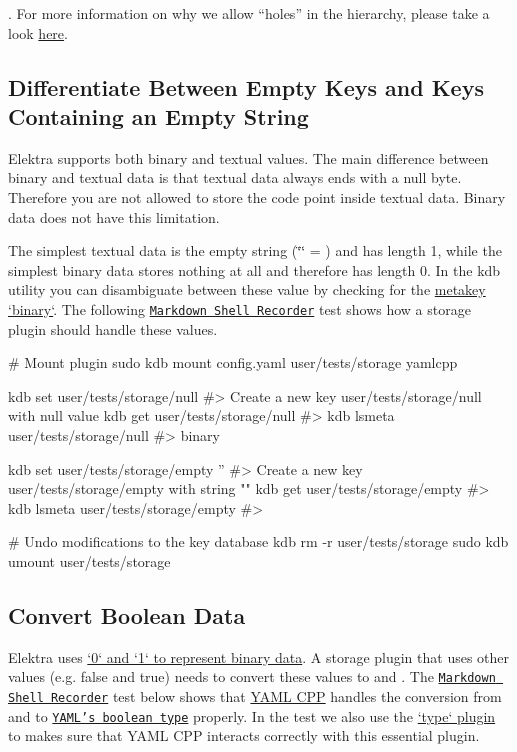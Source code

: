 . For more information on why we allow “holes” in the hierarchy, please take a look \hyperlink{doc_decisions_holes_md}{here}.

\subsection*{Differentiate Between Empty Keys and Keys Containing an Empty String}

Elektra supports both binary and textual values. The main difference between binary and textual data is that textual data always ends with a null byte. Therefore you are not allowed to store the code point {} inside textual data. Binary data does not have this limitation.

The simplest textual data is the empty string ({\ttfamily \char`\"{}\char`\"{}} = {}) and has length 1, while the simplest binary data stores nothing at all and therefore has length 0. In the {\ttfamily kdb} utility you can disambiguate between these value by checking for the \hyperlink{doc_help_elektra-metadata_md}{metakey `binary`}. The following \href{https://master.libelektra.org/tests/shell/shell_recorder/tutorial_wrapper}{\tt Markdown Shell Recorder} test shows how a storage plugin should handle these values.


\begin{DoxyCode}
# Mount plugin
sudo kdb mount config.yaml user/tests/storage yamlcpp

kdb set user/tests/storage/null
#> Create a new key user/tests/storage/null with null value
kdb get user/tests/storage/null
#>
kdb lsmeta user/tests/storage/null
#> binary

kdb set user/tests/storage/empty ''
#> Create a new key user/tests/storage/empty with string ""
kdb get user/tests/storage/empty
#>
kdb lsmeta user/tests/storage/empty
#>

# Undo modifications to the key database
kdb rm -r user/tests/storage
sudo kdb umount user/tests/storage
\end{DoxyCode}


\subsection*{Convert Boolean Data}

Elektra uses \hyperlink{doc_decisions_bool_md}{`0` and `1` to represent binary data}. A storage plugin that uses other values (e.\+g. {\ttfamily false} and {\ttfamily true}) needs to convert these values to {} and {}. The \href{https://master.libelektra.org/tests/shell/shell_recorder/tutorial_wrapper}{\tt Markdown Shell Recorder} test below shows that \hyperlink{md_src_plugins_yamlcpp_README_src_plugins_yamlcpp_README_md}{Y\+A\+ML C\+PP} handles the conversion from and to \href{https://yaml.org/spec/1.2/spec.html#id2803629}{\tt Y\+A\+M\+L’s boolean type} properly. In the test we also use the \hyperlink{md_src_plugins_type_README_src_plugins_type_README_md}{`type` plugin} to makes sure that Y\+A\+ML C\+PP interacts correctly with this essential plugin.


